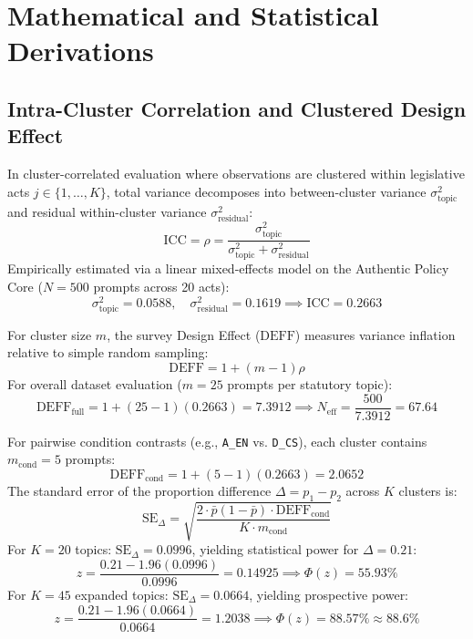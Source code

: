 \section{Mathematical and Statistical Derivations}
\label{sec:supp_statistics}

\subsection{Intra-Cluster Correlation and Clustered Design Effect}
In cluster-correlated evaluation where observations are clustered within legislative acts $j \in \{1, \dots, K\}$, total variance decomposes into between-cluster variance $\sigma^2_{\text{topic}}$ and residual within-cluster variance $\sigma^2_{\text{residual}}$:
\begin{equation}
\text{ICC} = \rho = \frac{\sigma^2_{\text{topic}}}{\sigma^2_{\text{topic}} + \sigma^2_{\text{residual}}}
\end{equation}
Empirically estimated via a linear mixed-effects model on the Authentic Policy Core ($N=500$ prompts across 20 acts):
\begin{equation}
\sigma^2_{\text{topic}} = 0.0588, \quad \sigma^2_{\text{residual}} = 0.1619 \implies \text{ICC} = 0.2663
\end{equation}

For cluster size $m$, the survey Design Effect ($\text{DEFF}$) measures variance inflation relative to simple random sampling:
\begin{equation}
\text{DEFF} = 1 + (m - 1)\rho
\end{equation}
For overall dataset evaluation ($m = 25$ prompts per statutory topic):
\begin{equation}
\text{DEFF}_{\text{full}} = 1 + (25 - 1)(0.2663) = 7.3912 \implies N_{\text{eff}} = \frac{500}{7.3912} = 67.64
\end{equation}

For pairwise condition contrasts (e.g., \texttt{A\_EN} vs. \texttt{D\_CS}), each cluster contains $m_{\text{cond}} = 5$ prompts:
\begin{equation}
\text{DEFF}_{\text{cond}} = 1 + (5 - 1)(0.2663) = 2.0652
\end{equation}
The standard error of the proportion difference $\Delta = p_1 - p_2$ across $K$ clusters is:
\begin{equation}
\text{SE}_{\Delta} = \sqrt{\frac{2 \cdot \bar{p}(1 - \bar{p}) \cdot \text{DEFF}_{\text{cond}}}{K \cdot m_{\text{cond}}}}
\end{equation}
For $K = 20$ topics: $\text{SE}_{\Delta} = 0.0996$, yielding statistical power for $\Delta = 0.21$:
\begin{equation}
z = \frac{0.21 - 1.96(0.0996)}{0.0996} = 0.14925 \implies \Phi(z) = 55.93\%
\end{equation}
For $K = 45$ expanded topics: $\text{SE}_{\Delta} = 0.0664$, yielding prospective power:
\begin{equation}
z = \frac{0.21 - 1.96(0.0664)}{0.0664} = 1.2038 \implies \Phi(z) = 88.57\% \approx 88.6\%
\end{equation}

